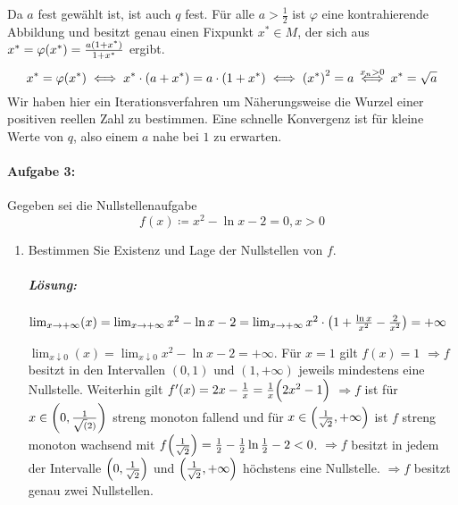 \documentclass{scrreprt}
\begin{document}
Da $a$ fest gewählt ist, ist auch $q$ fest.
Für alle $a > \frac{1}{2}$ ist $\varphi$ eine kontrahierende Abbildung und
besitzt genau einen Fixpunkt $x^* \in M$, der sich aus
$x^* = \varphi\qty(x^*) = \frac{a\qty(1 + x^*)}{1 + x^*}$ ergibt.
\[
  x^* = \varphi\qty(x^*)
  \iff x^* \cdot (a + x^*) = a \cdot (1 + x^*)
  \iff \qty(x^*)^2 = a
  \overset{x_n > 0}\iff x^* = \sqrt{a}
\]
Wir haben hier ein Iterationsverfahren um Näherungsweise die Wurzel einer
positiven reellen Zahl zu bestimmen.
Eine schnelle Konvergenz ist für kleine Werte von $q$, also einem $a$ nahe bei
$1$ zu erwarten.

\paragraph{Aufgabe 3:} Gegeben sei die Nullstellenaufgabe
\[
  f(x) \coloneqq x^2 - \ln x  - 2 = 0, x > 0
\]
\begin{enumerate}
\item Bestimmen Sie Existenz und Lage der Nullstellen von $f$.
  \subparagraph{Lösung:} $\lim_{x \to +\infty} (x) =
  \lim_{x \to +\infty} x^2 - \ln x  - 2
  = \lim_{x \to +\infty} x^2 \cdot \qty(1 + \frac{\ln x}{x ^ 2} - \frac{2}{x^2}) = +\infty$

  $\lim_{x \downarrow 0} (x) =
  \lim_{x \downarrow 0} x^2 - \ln x  - 2 = +\infty$.
  Für $x = 1$ gilt $f(x) = 1$
  $\Rightarrow f$ besitzt in den Intervallen $(0, 1)$ und $(1, +\infty)$
  jeweils mindestens eine Nullstelle.
  Weiterhin gilt $f'(x) = 2x - \frac{1}{x} = \frac{1}{x} \qty\Big(2 x^2  - 1)$
  $\Rightarrow f$ ist für $x \in \qty(0, \frac{1}{\sqrt(2)})$ streng monoton
  fallend und für $x \in \qty(\frac{1}{\sqrt{2}}, +\infty)$ ist $f$ streng
  monoton wachsend mit
  $f\qty(\frac{1}{\sqrt{2}}) = \frac{1}{2} - \frac{1}{2} \ln \frac{1}{2} - 2 < 0$.
  $\Rightarrow f$ besitzt in jedem der Intervalle
  $\qty(0, \frac{1}{\sqrt{2}})$ und $\qty(\frac{1}{\sqrt{2}}, +\infty)$
  höchstens eine Nullstelle.
  $\Rightarrow f$ besitzt genau zwei Nullstellen.

\end{enumerate}
\end{document}
